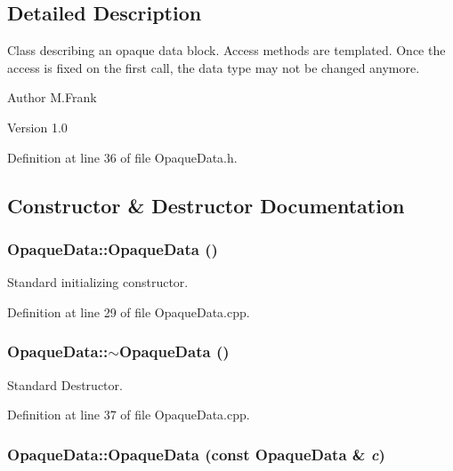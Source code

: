 \subsection{Detailed Description}
Class describing an opaque data block. Access methods are templated. Once the access is fixed on the first call, the data type may not be changed anymore.

\begin{DoxyAuthor}{Author}
M.Frank 
\end{DoxyAuthor}
\begin{DoxyVersion}{Version}
1.0 
\end{DoxyVersion}


Definition at line 36 of file OpaqueData.h.

\subsection{Constructor \& Destructor Documentation}
\hypertarget{class_d_d4hep_1_1_opaque_data_a7651964645b371a757c78163ce663fd2}{
\subsubsection[{OpaqueData}]{\setlength{\rightskip}{0pt plus 5cm}OpaqueData::OpaqueData ()}}
\label{class_d_d4hep_1_1_opaque_data_a7651964645b371a757c78163ce663fd2}


Standard initializing constructor. 

Definition at line 29 of file OpaqueData.cpp.\hypertarget{class_d_d4hep_1_1_opaque_data_aff696a10919b804f7bb347f9430b39b3}{
\subsubsection[{$\sim$OpaqueData}]{\setlength{\rightskip}{0pt plus 5cm}OpaqueData::$\sim$OpaqueData ()}}
\label{class_d_d4hep_1_1_opaque_data_aff696a10919b804f7bb347f9430b39b3}


Standard Destructor. 

Definition at line 37 of file OpaqueData.cpp.\hypertarget{class_d_d4hep_1_1_opaque_data_ae734cb8604b7f256cfd66e4e460913d3}{
\subsubsection[{OpaqueData}]{\setlength{\rightskip}{0pt plus 5cm}OpaqueData::OpaqueData (const {\bf OpaqueData} \& {\em c})}}
\label{class_d_d4hep_1_1_opaque_data_ae734cb8604b7f256cfd66e4e460913d3}


